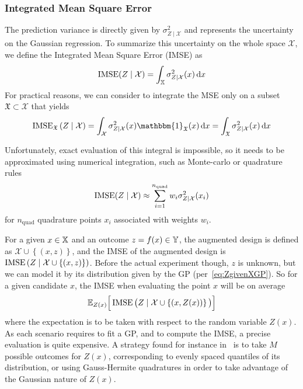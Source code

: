 \documentclass[../../Main_ManuscritThese.tex]{subfiles}
\begin{document}
\subsubsection{Integrated Mean Square Error}
The prediction variance is directly given by $\sigma^2_{Z\mid \mathcal{X}}$ and represents the uncertainty on the Gaussian regression. To summarize this uncertainty on the whole space $\mathcal{X}$, we define the Integrated Mean Square Error (IMSE)\cite{sacks_designs_1989}
 as
\begin{equation}
  \operatorname{\mathrm{IMSE}}(Z \mid \mathcal{X}) = \int_{\mathbb{X}} \sigma_{Z\mid\mathcal{X}}^2(x)\,\mathrm{d}x
\end{equation}
For practical reasons, we can consider to integrate the MSE only on a subset $\mathfrak{X}\subset \mathcal{X}$ that yields
\begin{equation}
  \IMSE_{\mathfrak{X}}\left(Z \mid \mathcal{X} \right) = \int_{\mathcal{X}} \sigma^2_{Z\mid \mathcal{X}}(x)  \mathbbm{1}_{\mathfrak{X}}(x)\,\mathrm{d}x = \int_{\mathfrak{X}} \sigma^2_{Z\mid \mathcal{X}}(x)\,\mathrm{d}x
\end{equation}

Unfortunately, exact evaluation of this integral is impossible, so it needs to be approximated using numerical integration, such as Monte-carlo or quadrature rules
\begin{equation}
  \operatorname{\mathrm{IMSE}}(Z\mid \mathcal{X}) \approx \sum_{i=1}^{n_{\mathrm{quad}}} w_i \sigma^2_{Z\mid\mathcal{X}}(x_i)
\end{equation}
for $n_{\mathrm{quad}}$ quadrature points $x_i$ associated with weights $w_i$.


For a given $x\in \mathbb{X}$ and an outcome $z=f(x)\in\mathbb{Y}$, the augmented design is defined as $\mathcal{X} \cup \left\{(x, z)\right\}$, and the IMSE of the augmented design is $\operatorname{\mathrm{IMSE}}\left(Z \mid \mathcal{X} \cup \left\{(x, z)\right\} \right)$.
Before the actual experiment though, $z$ is unknown, but we can model it by its distribution given by the GP (per~\cref{eq:ZgivenXGP}). So for a given candidate $x$, the IMSE when evaluating the point $x$ will be on average
\begin{equation}
  \label{eq:IMSE_augmented}
  \mathbb{E}_{Z(x)}\Big[\operatorname{\mathrm{IMSE}}\big(Z \mid \mathcal{X} \cup \left\{(x, Z(x))\right\} \big)\Big]
\end{equation}
where the expectation is to be taken with respect to the random variable $Z(x)$. As each scenario requires to fit a GP, and to compute the IMSE, a precise evaluation is quite expensive. A strategy found for instance in~\cite{villemonteix_informational_2006} is to take $M$ possible outcomes for $Z(x)$, corresponding to evenly spaced quantiles of its distribution, or using Gauss-Hermite quadratures in order to take advantage of the Gaussian nature of $Z(x)$.
\end{document}
